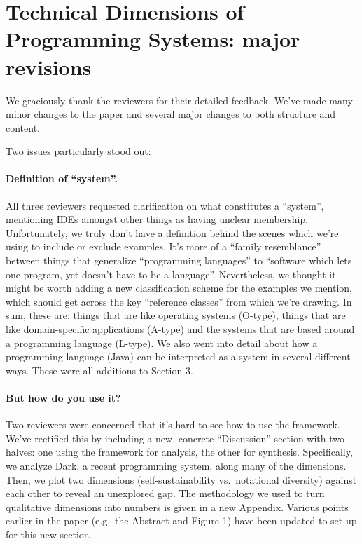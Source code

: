 \section*{Technical Dimensions of Programming Systems: major revisions}

We graciously thank the reviewers for their detailed feedback. We've
made many minor changes to the paper and several major changes to both
structure and content.

Two issues particularly stood out:

\paragraph{Definition of ``system''.}

All three reviewers requested clarification on what constitutes a
``system'', mentioning IDEs amongst other things as having unclear
membership. Unfortunately, we truly don't have a definition behind the
scenes which we're using to include or exclude examples. It's more of a
``family resemblance'' between things that generalize ``programming
languages'' to ``software which lets one program, yet doesn't have to be
a language''. Nevertheless, we thought it might be worth adding a new
classification scheme for the examples we mention, which should get
across the key ``reference classes'' from which we're drawing. In sum,
these are: things that are like operating systems (O-type), things that
are like domain-specific applications (A-type) and the systems that are
based around a programming language (L-type). We also went into detail
about how a programming language (Java) can be interpreted as a system
in several different ways. These were all additions to Section 3.

\paragraph{But how do you use it?}

Two reviewers were concerned that it's hard to see how to use the
framework. We've rectified this by including a new, concrete
``Discussion'' section with two halves: one using the framework for
analysis, the other for synthesis. Specifically, we analyze Dark, a
recent programming system, along many of the dimensions. Then, we plot
two dimensions (self-sustainability vs.~notational diversity) against
each other to reveal an unexplored gap. The methodology we used to turn
qualitative dimensions into numbers is given in a new Appendix. Various
points earlier in the paper (e.g.~the Abstract and Figure 1) have been
updated to set up for this new section.

